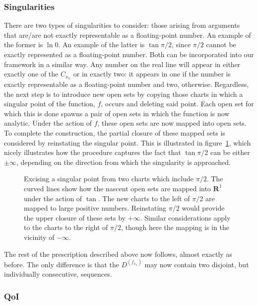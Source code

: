 \documentclass[prd,twocolumn,amsmath,amssymb,nofootinbib,eqsecnum]{revtex4-1}
\newcommand{\fig}[1]{figure~\ref{fig:#1}}
\begin{document}
\subsubsection{Singularities}

There are two types of singularities to consider: those arising from arguments that are/are not exactly representable as a floating-point number. An example of the former is $\ln 0$. An example of the latter is $\tan \pi/2$, since $\pi/2$ cannot be exactly represented as a floating-point number. Both can be incorporated into our framework in a similar way. Any number on the real line will appear in either exactly one of the $C_{x_n}$ or in exactly two: it appears in one if the number is exactly representable as a floating-point number and two, otherwise. Regardless, the next step is to introduce new open sets by copying those charts in which a singular point of the function, $f$, occurs and deleting said point. Each open set for which this is done spawns a pair of open sets in which the function is now analytic. Under the action of $f$, these open sets are now mapped into open sets. To complete the construction, the partial closure of these mapped sets is considered by reinstating the singular point. This is illustrated in \fig{Singularity}, which nicely illustrates how the procedure captures the fact that $\tan \pi/2$ can be either $\pm \infty$, depending on the direction from which the singularity is approached.
\begin{figure}[h]
\begin{center}
\resizebox{25em}{!}{}
\caption{Excising a singular point from two charts which include $\pi/2$. The curved lines show how the nascent open sets are mapped into $\mathbf{R}^1$ under the action of $\tan$. The new charts to the left of $\pi/2$ are mapped to large positive numbers. Reinstating $\pi/2$ would provide the upper closure of these sets by $+\infty$. Similar considerations apply to the charts to the right of $\pi/2$, though here the mapping is in the vicinity of $-\infty$.}
\label{fig:Singularity}
\end{center}
\end{figure}

The rest of the prescription described above now follows, almost exactly as before. The only difference is that the $D^{(f_{x_n})}$ may now contain two disjoint, but individually consecutive, sequences.

\subsubsection{QoI}
\end{document}
